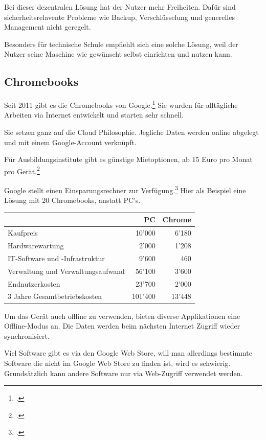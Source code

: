 Bei dieser dezentralen Lösung hat der Nutzer mehr Freiheiten. Dafür sind sicherheitsrelavente Probleme wie Backup, Verschlüsselung und generelles Management nicht geregelt.

Besonders für technische Schule empfiehlt sich eine solche Lösung, weil der Nutzer seine Maschine wie gewünscht selbst einrichten und nutzen kann.

\subsection{Chromebooks}
Seit 2011 gibt es die Chromebooks von Google.\footcite{Chromebooks_bersicht_2014-12-27}
Sie wurden für alltägliche Arbeiten via Internet entwickelt und starten sehr schnell.

Sie setzen ganz auf die Cloud Philosophie. Jegliche Daten werden online abgelegt und mit einem Google-Account verknüpft.

Für Ausbildungsinstitute gibt es günstige Mietoptionen, ab 15 Euro pro Monat pro Gerät.\footcite{Chromebook_Wikipedia_2014-12-27}

Google stellt einen Einsparungsrechner zur Verfügung.\footcite{Chromebooks_und_Chromeboxes_for_Education_2014-12-27}
Hier als Beispiel eine Lösung mit 20 Chromebooks, anstatt PC's.

\begin{table}[hb]
	\centering
	\small\renewcommand{\arraystretch}{1.4}
	
	\begin{tabular}{lrr}
		\hline
		\rowcolor{tableheadcolor}
		 & PC & Chrome \\
		\hline
		Kaufpreis & 10'000 & 6'180\\
		Hardwarewartung & 2'000 & 1'208\\
		IT-Software und -Infrastruktur & 9'600 & 460\\
		Verwaltung und Verwaltungsaufwand & 56'100 & 3'600\\
		Endnutzerkosten & 23'700 & 2'000\\
		3 Jahre Gesamtbetriebskosten & 101'400 & 13'448\\
		\hline
	\end{tabular}
\end{table}

Um das Gerät auch offline zu verwenden, bieten diverse Applikationen eine Offline-Modus an. Die Daten werden beim nächsten Internet Zugriff wieder synchronisiert.

Viel Software gibt es via den Google Web Store, will man allerdings bestimmte Software die nicht im Google Web Store zu finden ist, wird es schwierig.
Grundsätzlich kann andere Software nur via Web-Zugriff verwendet werden.